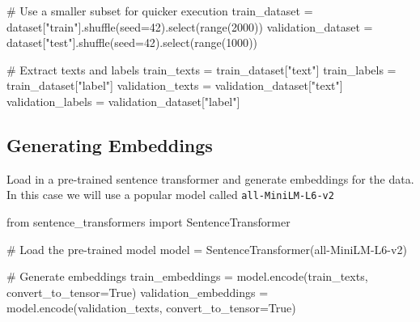 \documentclass[
  letterpaper,
  DIV=11,
  numbers=noendperiod]{scrreprt}
\newenvironment{Shaded}{\begin{snugshade}}{\end{snugshade}}
\newcommand{\BuiltInTok}[1]{\textcolor[rgb]{0.00,0.23,0.31}{#1}}
\newcommand{\CommentTok}[1]{\textcolor[rgb]{0.37,0.37,0.37}{#1}}
\newcommand{\DecValTok}[1]{\textcolor[rgb]{0.68,0.00,0.00}{#1}}
\newcommand{\ImportTok}[1]{\textcolor[rgb]{0.00,0.46,0.62}{#1}}
\newcommand{\NormalTok}[1]{\textcolor[rgb]{0.00,0.23,0.31}{#1}}
\newcommand{\OperatorTok}[1]{\textcolor[rgb]{0.37,0.37,0.37}{#1}}
\newcommand{\StringTok}[1]{\textcolor[rgb]{0.13,0.47,0.30}{#1}}
\newcommand{\VariableTok}[1]{\textcolor[rgb]{0.07,0.07,0.07}{#1}}
\begin{document}
\begin{Shaded}
\begin{Highlighting}[]
\CommentTok{\# Use a smaller subset for quicker execution}
\NormalTok{train\_dataset }\OperatorTok{=}\NormalTok{ dataset[}\StringTok{"train"}\NormalTok{].shuffle(seed}\OperatorTok{=}\DecValTok{42}\NormalTok{).select(}\BuiltInTok{range}\NormalTok{(}\DecValTok{2000}\NormalTok{))}
\NormalTok{validation\_dataset }\OperatorTok{=}\NormalTok{ dataset[}\StringTok{"test"}\NormalTok{].shuffle(seed}\OperatorTok{=}\DecValTok{42}\NormalTok{).select(}\BuiltInTok{range}\NormalTok{(}\DecValTok{1000}\NormalTok{))}

\CommentTok{\# Extract texts and labels}
\NormalTok{train\_texts }\OperatorTok{=}\NormalTok{ train\_dataset[}\StringTok{"text"}\NormalTok{]}
\NormalTok{train\_labels }\OperatorTok{=}\NormalTok{ train\_dataset[}\StringTok{"label"}\NormalTok{]}
\NormalTok{validation\_texts }\OperatorTok{=}\NormalTok{ validation\_dataset[}\StringTok{"text"}\NormalTok{]}
\NormalTok{validation\_labels }\OperatorTok{=}\NormalTok{ validation\_dataset[}\StringTok{"label"}\NormalTok{]}
\end{Highlighting}
\end{Shaded}

\subsection{Generating Embeddings}\label{generating-embeddings}

Load in a pre-trained sentence transformer and generate embeddings for
the data. In this case we will use a popular model called
\texttt{all-MiniLM-L6-v2}

\begin{Shaded}
\begin{Highlighting}[]
\ImportTok{from}\NormalTok{ sentence\_transformers }\ImportTok{import}\NormalTok{ SentenceTransformer}

\CommentTok{\# Load the pre{-}trained model}
\NormalTok{model }\OperatorTok{=}\NormalTok{ SentenceTransformer(}\StringTok{\textquotesingle{}all{-}MiniLM{-}L6{-}v2\textquotesingle{}}\NormalTok{)}

\CommentTok{\# Generate embeddings}
\NormalTok{train\_embeddings }\OperatorTok{=}\NormalTok{ model.encode(train\_texts, convert\_to\_tensor}\OperatorTok{=}\VariableTok{True}\NormalTok{)}
\NormalTok{validation\_embeddings }\OperatorTok{=}\NormalTok{ model.encode(validation\_texts, convert\_to\_tensor}\OperatorTok{=}\VariableTok{True}\NormalTok{)}
\end{Highlighting}
\end{Shaded}
\end{document}
